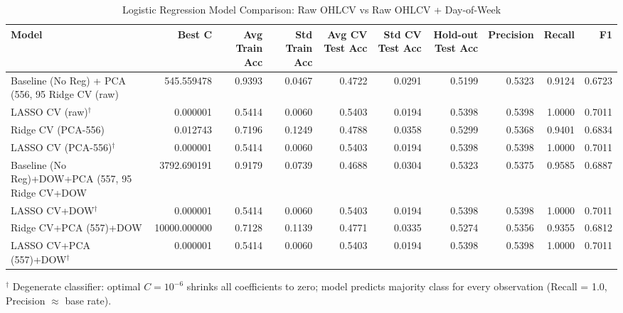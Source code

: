 \begin{table}[htbp]
\centering
\caption{Logistic Regression Model Comparison: Raw OHLCV vs Raw OHLCV + Day-of-Week}
\label{tab:base_logistic_comparison}
\begin{tabular}{lrrrrrrrrr}
\toprule
Model & Best C & Avg Train Acc & Std Train Acc & Avg CV Test Acc & Std CV Test Acc & Hold-out Test Acc & Precision & Recall & F1 \\
\midrule
Baseline (No Reg) + PCA (556, 95%
Ridge CV (raw) & 545.559478 & 0.9393 & 0.0467 & 0.4722 & 0.0291 & 0.5199 & 0.5323 & 0.9124 & 0.6723 \\
LASSO CV (raw)$^\dagger$ & 0.000001 & 0.5414 & 0.0060 & 0.5403 & 0.0194 & 0.5398 & 0.5398 & 1.0000 & 0.7011 \\
Ridge CV (PCA-556) & 0.012743 & 0.7196 & 0.1249 & 0.4788 & 0.0358 & 0.5299 & 0.5368 & 0.9401 & 0.6834 \\
LASSO CV (PCA-556)$^\dagger$ & 0.000001 & 0.5414 & 0.0060 & 0.5403 & 0.0194 & 0.5398 & 0.5398 & 1.0000 & 0.7011 \\
\midrule
Baseline (No Reg)+DOW+PCA (557, 95%
Ridge CV+DOW & 3792.690191 & 0.9179 & 0.0739 & 0.4688 & 0.0304 & 0.5323 & 0.5375 & 0.9585 & 0.6887 \\
LASSO CV+DOW$^\dagger$ & 0.000001 & 0.5414 & 0.0060 & 0.5403 & 0.0194 & 0.5398 & 0.5398 & 1.0000 & 0.7011 \\
Ridge CV+PCA (557)+DOW & 10000.000000 & 0.7128 & 0.1139 & 0.4771 & 0.0335 & 0.5274 & 0.5356 & 0.9355 & 0.6812 \\
LASSO CV+PCA (557)+DOW$^\dagger$ & 0.000001 & 0.5414 & 0.0060 & 0.5403 & 0.0194 & 0.5398 & 0.5398 & 1.0000 & 0.7011 \\
\bottomrule
\end{tabular}
\par\smallskip
\footnotesize $^\dagger$ Degenerate classifier: optimal $C = 10^{-6}$ shrinks all coefficients to zero; model predicts majority class for every observation (Recall = 1.0, Precision $\approx$ base rate).
\end{table}
